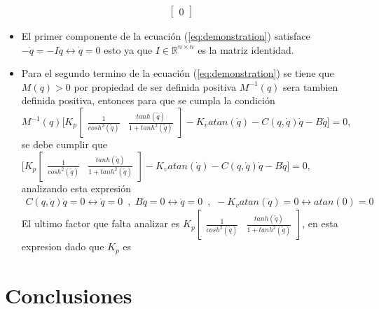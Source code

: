 \documentclass[12pt]{article}
\begin{document}
\begin{enumerate}
\begin{equation}
\begin{split}
\begin{bmatrix}
                0
            \end{bmatrix}
        \end{split}
        \label{eq:demonstration}
    \end{equation}
    \begin{itemize}
        \item El primer componente de la ecuación (\ref{eq:demonstration}) satisface $-\dot{q}=-I\dot{q}\leftrightarrow \dot{q}=0$ esto ya que $I \in \mathbb{R}^{n\times n}$ es la matriz identidad.
        \item Para el segundo termino de la ecuación (\ref{eq:demonstration}) se tiene que $M(q)>0$
        por propiedad de ser definida positiva $M^{-1}(q)$ sera tambien definida positiva, entonces para que se cumpla la condición $M^{-1}(q)\lbrack K_p
        \begin{bmatrix}
            \frac{1}{cosh^2(\tilde{q})}&\frac{tanh(\tilde{q})}{1+tanh^2(\tilde{q})}
        \end{bmatrix}
        -K_vatan(\dot{q})-C(q,\dot{q})\dot{q}-B\dot{q}\rbrack=0$, se debe cumplir que $\lbrack K_p
        \begin{bmatrix}
            \frac{1}{cosh^2(\tilde{q})}&\frac{tanh(\tilde{q})}{1+tanh^2(\tilde{q})}
        \end{bmatrix}
        -K_vatan(\dot{q})-C(q,\dot{q})\dot{q}-B\dot{q}\rbrack=0$, analizando esta expresión
        \begin{equation}
            \begin{split}
                C(q,\dot{q})\dot{q}=0\leftrightarrow\dot{q}=0\enspace \text{,}\enspace 
                B\dot{q}=0\leftrightarrow\dot{q}=0\enspace \text{,}\enspace -K_vatan(\dot{q})=0\leftrightarrow atan(0)=0
            \end{split}
            \label{eq:conditions}
        \end{equation}
        El ultimo factor que falta analizar es $K_p
        \begin{bmatrix}
            \frac{1}{cosh^2(\tilde{q})}&\frac{tanh(\tilde{q})}{1+tanh^2(\tilde{q})}
        \end{bmatrix}$, en esta expresion dado que $K_p$ es 
    \end{itemize} 
\end{enumerate}
\section{Conclusiones}


\end{document}

